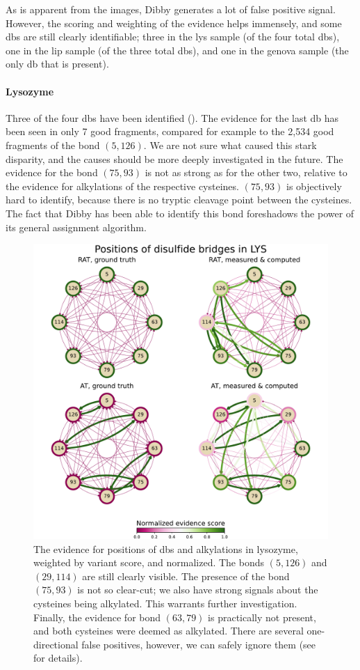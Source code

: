 As is apparent from the images, Dibby generates a lot of false positive signal. However, the scoring and weighting of the evidence helps immensely, and some \glspl*{db} are still clearly identifiable; three in the \gls*{lys} sample (of the four total \glspl*{db}), one in the \gls*{lip} sample (of the three total \glspl*{db}), and one in the \gls*{genova} sample (the only \gls*{db} that is present).


\paragraph{Lysozyme} Three of the four \glspl*{db} have been identified (). The evidence for the last \gls*{db} has been seen in only 7 good fragments, compared for example to the 2,534 good fragments of the bond \((5, 126)\). We are not sure what caused this stark disparity, and the causes should be more deeply investigated in the future. The evidence for the bond \((75, 93)\) is not as strong as for the other two, relative to the evidence for alkylations of the respective cysteines. \((75, 93)\) is objectively hard to identify, because there is no tryptic cleavage point between the cysteines. The fact that Dibby has been able to identify this bond foreshadows the power of its general assignment algorithm.

\begin{figure}
  \centering
  \includegraphics[width=0.9\linewidth]{img/pdfa-lys.pdf}
  \caption{The evidence for positions of \glspl*{db} and alkylations in lysozyme, weighted by variant score, and normalized. The bonds \((5, 126)\) and \((29, 114)\) are still clearly visible. The presence of the bond \((75, 93)\) is not so clear-cut; we also have strong signals about the cysteines being alkylated. This warrants further investigation. Finally, the evidence for bond \((63, 79)\) is practically not present, and both cysteines were deemed as alkylated. There are several one-directional false positives, however, we can safely ignore them (see  for details).}\label{fig:lys}
\end{figure}

